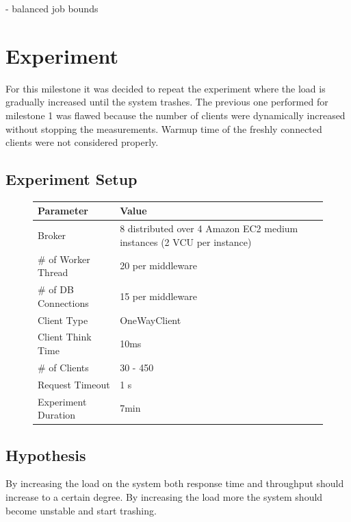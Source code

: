 \documentclass[a4paper]{article}
\begin{document}
- balanced job bounds

\section{Experiment}
\label{sec:experiment}
For this milestone it was decided to repeat the experiment where the load is gradually increased until the system trashes. The previous one performed for milestone 1 was flawed because the number of clients were dynamically increased without stopping the measurements. Warmup time of the freshly connected clients were not considered properly.

\subsection{Experiment Setup}


\begin{figure}[H]
\label{tabular:experimentsetup}
\begin{center}
\begin{tabular}{|l|l|}
\hline 
\textbf{Parameter} & \textbf{Value} \\ 
\hline 
Broker & 8 distributed over 4 Amazon EC2 medium  instances (2 VCU per instance)\\ 
\hline 
\# of Worker Thread & 20 per middleware \\
\hline 
\# of DB Connections & 15 per middleware \\
\hline 
Client Type & OneWayClient \\ 
\hline 
Client Think Time & 10ms \\ 
\hline 
\# of Clients & 30 - 450 \\ 
\hline 
Request Timeout & 1 s\\
\hline 
Experiment Duration & 7min \\ 
\hline 
\end{tabular} 
\end{center}
\end{figure}


\subsection{Hypothesis}

By increasing the load on the system both response time and throughput should increase to
a certain degree. By increasing the load more the system should become unstable and start
trashing.
\end{document}
